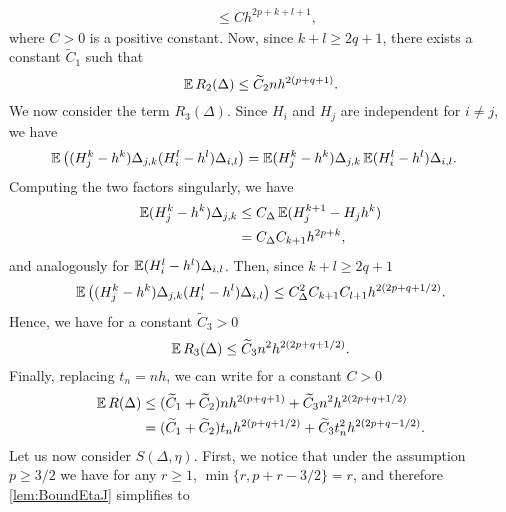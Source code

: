 \documentclass[10pt]{article}
\begin{document}
{\begin{equation}
\begin{aligned}
		 &\leq C h^{2p+k+l+1},
	\end{aligned}
	\end{equation}
	where $C > 0$ is a positive constant. Now, since $k+l \geq 2q+1$, there exists a constant $\tilde C_1$ such that
	\begin{equation}
		\operatorname{\mathbb{E}} R_2(\Delta) \leq \widetilde C_2 n h^{2(p+q+1)}.
	\end{equation}	
	We now consider the term $R_3(\Delta)$. Since $H_i$ and $H_j$ are independent for $i \neq j$, we have
	\begin{equation}
	\begin{aligned}
		\operatorname{\mathbb{E}} \big((H_j^k - h^k)\Delta_{j,k}(H_i^l - h^l) \Delta_{i,l}\big) &= \operatorname{\mathbb{E}} (H_j^k - h^k)\Delta_{j,k} \operatorname{\mathbb{E}} (H_i^l - h^l) \Delta_{i,l}.
	\end{aligned}
	\end{equation}
	Computing the two factors singularly, we have
	\begin{equation}\label{eq:RemainderThirdBound}
	\begin{aligned}
		\operatorname{\mathbb{E}} (H_j^k - h^k)\Delta_{j,k} &\leq C_\Delta \operatorname{\mathbb{E}}(H_j^{k+1} - H_jh^k) \\
		&= C_\Delta C_{k+1} h^{2p+k},
	\end{aligned}
	\end{equation}
	and analogously for $\operatorname{\mathbb{E}} (H_i^l - h^l) \Delta_{i,l}$. Then, since $k+l \geq 2q+1$
	\begin{equation}
		\operatorname{\mathbb{E}} \big((H_j^k - h^k)\Delta_{j,k}(H_i^l - h^l) \Delta_{i,l}\big) \leq C_\Delta^2 C_{k+1} C_{l+1} h^{2(2p+q+1/2)}.
	\end{equation}
	Hence, we have for a constant $\tilde C_3 > 0$ 
	\begin{equation}
		\operatorname{\mathbb{E}} R_3(\Delta) \leq \widetilde C_3 n^2 h^{2(2p+q+1/2)}.
	\end{equation}
	Finally, replacing $t_n = nh$, we can write for a constant $C > 0$
	\begin{equation}
	\begin{aligned}
		\operatorname{\mathbb{E}} R(\Delta) &\leq (\widetilde C_1 + \widetilde C_2) n h^{2(p+q+1)} + \widetilde C_3 n^2 h^{2(2p+q+1/2)}\\
		&= (\widetilde C_1 + \widetilde C_2) t_n h^{2(p + q + 1/2)} + \widetilde C_3 t_n^2 h^{2(2p + q - 1/2)}.
	\end{aligned}
	\end{equation}
	Let us now consider $S(\Delta, \eta)$. First, we notice that under the assumption $p \geq 3/2$ we have for any $r \geq 1$, $\min\{r, p+r-3/2\} = r$, and therefore \cref{lem:BoundEtaJ} simplifies to 
	\begin{equation}

\end{equation}}
\end{document}
